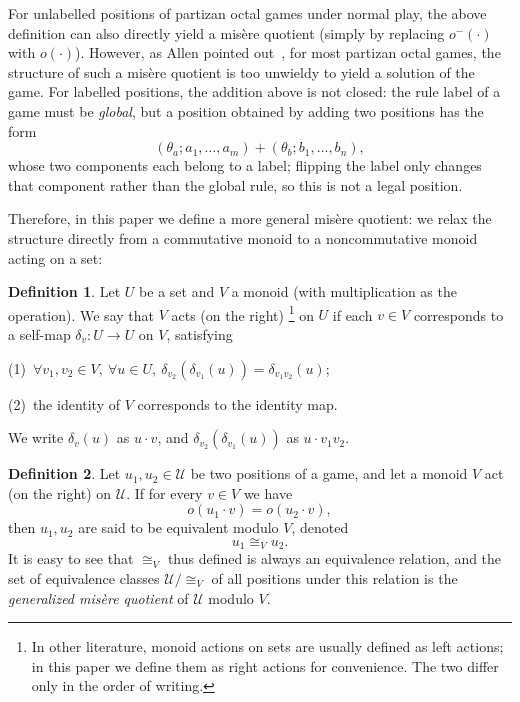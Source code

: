 \documentclass[11pt]{article}
\theoremstyle{definition}
\newtheorem{definition}{Definition}[section]
\theoremstyle{plain}
\newcommand{\varU}{\mathcal{U}}
\begin{document}
For unlabelled positions of partizan octal games under normal play, the above definition can also directly yield a misère quotient (simply by replacing $o^-(\cdot)$ with $o(\cdot)$).
However, as Allen pointed out~\cite{PartMis2010}, for most partizan octal games, the structure of such a misère quotient is too unwieldy to yield a solution of the game.
For labelled positions, the addition above is not closed: the rule label of a game must be \textit{global}, but a position obtained by adding two positions has the form
\[
    (\theta_a; a_1, \ldots, a_m) + (\theta_b; b_1, \ldots, b_n),
\]
whose two components each belong to a label; flipping the label only changes that component rather than the global rule, so this is not a legal position.

Therefore, in this paper we define a more general misère quotient: we relax the structure directly from a commutative monoid to a noncommutative monoid acting on a set:

\begin{definition}\label{def:s_serie}
    Let $U$ be a set and $V$ a monoid (with multiplication as the operation). We say that $V$ acts (on the right)
    \footnote{In other literature, monoid actions on sets are usually defined as left actions; in this paper we define them as right actions for convenience. The two differ only in the order of writing.}
    on $U$ if each $v\in V$ corresponds to a self-map $\delta_v: U\rightarrow U$ on $V$, satisfying

    (1)~$\forall v_1, v_2 \in V,\ \forall u\in U,\ \delta_{v_2}(\delta_{v_1}(u))= \delta_{v_1 v_2}(u)$;

    (2)~the identity of $V$ corresponds to the identity map.

    We write $\delta_v (u)$ as $u \cdot v$, and $\delta_{v_2}(\delta_{v_1}(u))$ as $u \cdot v_1 v_2$.
\end{definition}

\begin{definition}\label{def:expanded_misquot}
    Let $u_1, u_2 \in \varU$ be two positions of a game, and let a monoid $V$ act (on the right) on $\varU$.
    If for every $v\in V$ we have
    \[
        o(u_1 \cdot v) = o(u_2 \cdot v),
    \]
    then $u_1, u_2$ are said to be equivalent modulo $V$, denoted
    \[
        u_1 \cong_{V} u_2.
    \]
    It is easy to see that $\cong_{V}$ thus defined is always an equivalence relation,
    and the set of equivalence classes $\varU / \cong_{V}$ of all positions under this relation is the \textit{generalized misère quotient} of $\varU$ modulo $V$.
\end{definition}
\end{document}
